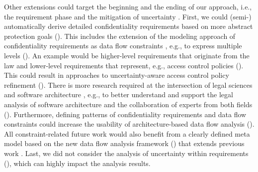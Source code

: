 Other extensions could target the beginning and the ending of our approach, i.e., the requirement phase and the mitigation of uncertainty \cite{niehues_architecture-based_2025}.
First, we could (semi-) automatically derive detailed confidentiality requirements based on more abstract protection goals ().
This includes the extension of the modeling approach of confidentiality requirements as data flow constraints \cite{hahner_modeling_2021}, e.g., to express multiple levels ().
An example would be higher-level requirements that originate from the law and lower-level requirements that represent, e.g., access control policies ().
This could result in approaches to uncertainty-aware access control policy refinement \cite{hahner_architectural_2021} ().
There is more research required at the intersection of legal sciences and software architecture \cite{boltz_model-based_2022}, e.g., to better understand and support the legal analysis of software architecture and the collaboration of experts from both fields ().
Furthermore, defining patterns of confidentiality requirements and data flow constraints could increase the usability of architecture-based data flow analysis ().
All constraint-related future work would also benefit from a clearly defined meta model based on the new data flow analysis framework () that extends previous work \cite{hahner_modeling_2021}.
Last, we did not consider the analysis of uncertainty within requirements (), which can highly impact the analysis results.

